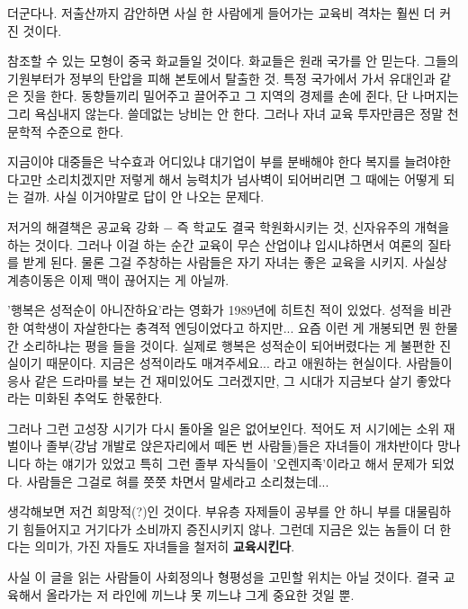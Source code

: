 더군다나. 저출산까지 감안하면 사실 한 사람에게 들어가는 교육비 격차는 훨씬 더 커진 것이다.
\vspace{5mm}

참조할 수 있는 모형이 중국 화교들일 것이다.
화교들은 원래 국가를 안 믿는다. 그들의 기원부터가 정부의 탄압을 피해 본토에서 탈출한 것.
특정 국가에서 가서 유대인과 같은 짓을 한다. 동향들끼리 밀어주고 끌어주고 그 지역의 경제를 손에 쥔다, 단 나머지는 그리 욕심내지 않는다.
쓸데없는 낭비는 안 한다. 그러나 자녀 교육 투자만큼은 정말 천문학적 수준으로 한다.
\vspace{5mm}

지금이야 대중들은 낙수효과 어디있냐 대기업이 부를 분배해야 한다 복지를 늘려야한다고만 소리치겠지만
저렇게 해서 능력치가 넘사벽이 되어버리면 그 때에는 어떻게 되는 걸까.
사실 이거야말로 답이 안 나오는 문제다.
\vspace{5mm}

저거의 해결책은 공교육 강화 $-$ 즉 학교도 결국 학원화시키는 것, 신자유주의 개혁을 하는 것이다.
그러나 이걸 하는 순간 교육이 무슨 산업이냐 입시냐하면서 여론의 질타를 받게 된다. 물론 그걸 주창하는 사람들은 자기 자녀는 좋은 교육을 시키지.
사실상 계층이동은 이제 맥이 끊어지는 게 아닐까.
\vspace{5mm}

'행복은 성적순이 아니잔하요'라는 영화가 1989년에 히트친 적이 있었다.
성적을 비관한 여학생이 자살한다는 충격적 엔딩이었다고 하지만... 요즘 이런 게 개봉되면 뭔 한물간 소리하냐는 평을 들을 것이다.
실제로 행복은 성적순이 되어버렸다는 게 불편한 진실이기 때문이다.
지금은 성적이라도 매겨주세요... 라고 애원하는 현실이다.
사람들이 응사 같은 드라마를 보는 건 재미있어도 그러겠지만, 그 시대가 지금보다 살기 좋았다라는 미화된 추억도 한몫한다.
\vspace{5mm}

그러나 그런 고성장 시기가 다시 돌아올 일은 없어보인다.
적어도 저 시기에는 소위 재벌이나 졸부(강남 개발로 앉은자리에서 떼돈 번 사람들)들은 자녀들이 개차반이다 망나니다 하는 얘기가 있었고
특히 그런 졸부 자식들이 '오렌지족'이라고 해서 문제가 되었다.
사람들은 그걸로 혀를 쯧쯧 차면서 말세라고 소리쳤는데...
\vspace{5mm}

생각해보면 저건 희망적(?)인 것이다. 부유층 자제들이 공부를 안 하니 부를 대물림하기 힘들어지고 거기다가 소비까지 증진시키지 않나.
그런데 지금은 있는 놈들이 더 한다는 의미가, 가진 자들도 자녀들을 철저히 \textbf{교육시킨다}.
\vspace{5mm}

사실 이 글을 읽는 사람들이 사회정의나 형평성을 고민할 위치는 아닐 것이다.
결국 교육해서 올라가는 저 라인에 끼느냐 못 끼느냐 그게 중요한 것일 뿐.
\vspace{5mm}






